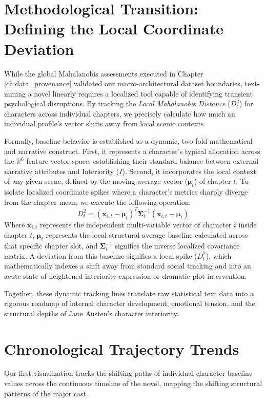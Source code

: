 \section{Methodological Transition: Defining the Local Coordinate Deviation}
While the global Mahalanobis assessments executed in Chapter \ref{ch:data_provenance} validated our macro-architectural dataset boundaries, text-mining a novel linearly requires a localized tool capable of identifying transient psychological disruptions. By tracking the \textit{Local Mahalanobis Distance} ($D^2_t$) for characters across individual chapters, we precisely calculate how much an individual profile's vector shifts away from local scenic contexts.

Formally, baseline behavior is established as a dynamic, two-fold mathematical and narrative construct. First, it represents a character’s typical allocation across the $\mathbb{R}^6$ feature vector space, establishing their standard balance between external narrative attributes and Interiority ($I$). Second, it incorporates the local context of any given scene, defined by the moving average vector ($\boldsymbol{\mu}_t$) of chapter $t$. To isolate localized coordinate spikes where a character's metrics sharply diverge from the chapter mean, we execute the following operation:
\begin{equation}
D_t^2 = (\mathbf{x}_{i,t} - \boldsymbol{\mu}_t)^T \boldsymbol{\Sigma}_t^{-1} (\mathbf{x}_{i,t} - \boldsymbol{\mu}_t)
\end{equation}
Where $\mathbf{x}_{i,t}$ represents the independent multi-variable vector of character $i$ inside chapter $t$, $\boldsymbol{\mu}_t$ represents the local structural average baseline calculated across that specific chapter slot, and $\boldsymbol{\Sigma}_t^{-1}$ signifies the inverse localized covariance matrix. A deviation from this baseline signifies a local spike ($D^2_t$), which mathematically indexes a shift away from standard social tracking and into an acute state of heightened interiority expression or dramatic plot intervention.

Together, these dynamic tracking lines translate raw statistical text data into a rigorous roadmap of internal character development, emotional tension, and the structural depths of Jane Austen's character interiority.

\section{Chronological Trajectory Trends}
Our first visualization tracks the shifting paths of individual character baseline values across the continuous timeline of the novel, mapping the shifting structural patterns of the major cast.

